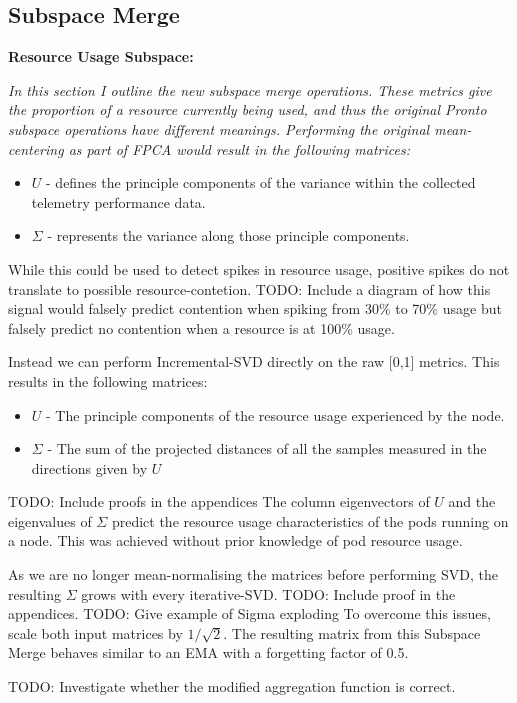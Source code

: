 \subsection{Subspace Merge}
\begin{tcolorbox}[boxsep=0mm,left=2.5mm,right=2.5mm]
    \textbf{Resource Usage Subspace:} {\em In this section I outline the new
    subspace merge operations. These metrics give the proportion of a resource
    currently being used, and thus the original Pronto subspace operations have
    different meanings. Performing the original mean-centering as part of FPCA
    would result in the following matrices:
    \begin{itemize}
    \item $U$ - defines the principle components of the variance within the
    collected telemetry performance data.
    \item $\Sigma$ - represents the variance along those principle components.
    \end{itemize}
    While this could be used to detect spikes in resource usage, positive spikes
    do not translate to possible resource-contetion.
    TODO: Include a diagram of how this signal would falsely predict contention
    when spiking from 30\% to 70\% usage but falsely predict no contention when
    a resource is at 100\% usage.

    Instead we can perform Incremental-SVD directly on the raw [0,1] metrics.
    This results in the following matrices:
    \begin{itemize}
    \item $U$ - The principle components of the resource usage experienced by
    the node.
    \item $\Sigma$ - The sum of the projected distances of all the samples
    measured in the directions given by $U$
    \end{itemize}
    TODO: Include proofs in the appendices
    The column eigenvectors of $U$ and the eigenvalues of $\Sigma$ predict the
    resource usage characteristics of the pods running on a node. This was
    achieved without prior knowledge of pod resource usage.

    As we are no longer mean-normalising the matrices before performing SVD, the
    resulting $\Sigma$ grows with every iterative-SVD.
    TODO: Include proof in the appendices.
    TODO: Give example of Sigma exploding
    To overcome this issues, scale both input matrices by $1/\sqrt{2}$. The
    resulting matrix from this Subspace Merge behaves similar to an EMA with a
    forgetting factor of 0.5.

    TODO: Investigate whether the modified aggregation function is correct.
}
\end{tcolorbox}

